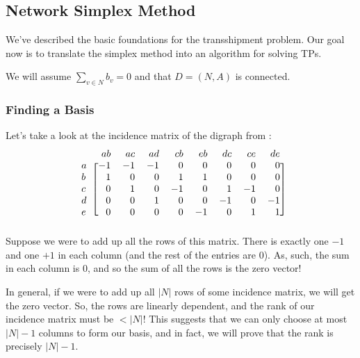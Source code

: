\subsection{Network Simplex Method}\label{sec:tp_nsm}
We've described the basic foundations for the transshipment problem. Our goal now is to translate the simplex method into an algorithm for solving TPs.

\begin{remark}
We will assume $\sum_{v \in N} b_v = 0$ and that $D = (N,A)$ is connected.
\end{remark}

\subsubsection{Finding a Basis}

Let's take a look at the incidence matrix of the digraph from :
\[
  \begin{blockarray}{rrrrrrrrr}
      & ab & ac & ad & cb & eb & dc & ce & de \\
  \begin{block}{l[rrrrrrrr]}
    a & -1 & -1 & -1 &  0 &  0 &  0 &  0 &  0 \\
    b &  1 &  0 &  0 &  1 &  1 &  0 &  0 &  0 \\
    c &  0 &  1 &  0 & -1 &  0 &  1 & -1 &  0 \\
    d &  0 &  0 &  1 &  0 &  0 & -1 &  0 & -1 \\
    e &  0 &  0 &  0 &  0 & -1 &  0 &  1 &  1 \\
  \end{block}
  \end{blockarray}
\]
Suppose we were to add up all the rows of this matrix. There is exactly one $-1$ and one $+1$ in each column (and the rest of the entries are $0$). As, such, the sum in each column is $0$, and so the sum of all the rows is the zero vector!

In general, if we were to add up all $|N|$ rows of some incidence matrix, we will get the zero vector. So, the rows are linearly dependent, and the rank of our incidence matrix must be $< |N|$!
This suggests that we can only choose at most $|N| - 1$ columns to form our basis, and in fact, we will prove that the rank is precisely $|N| - 1$.


